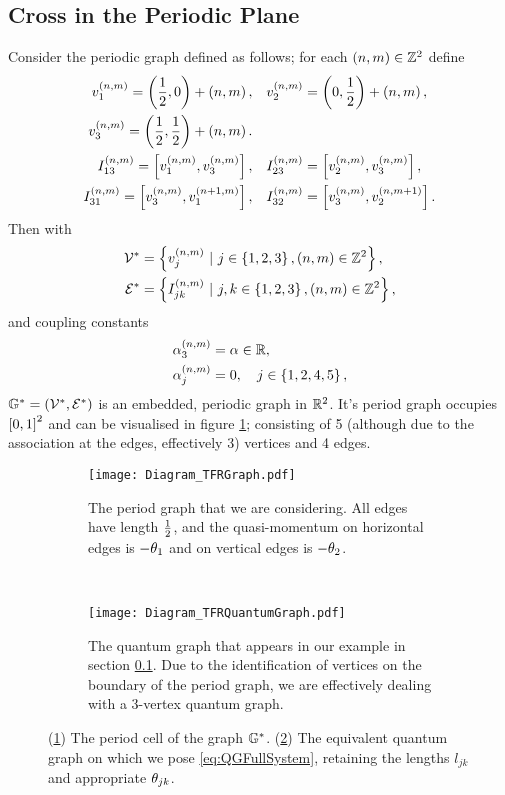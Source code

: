 \subsection{Cross in the Periodic Plane} \label{ssec:ExampleCrossInPlane}
Consider the periodic graph defined as follows; for each $\left( n,m \right)\in\mathbb{Z}^2$ define
\begin{align*}
	v_1^{\left( n,m \right)} = \left( \frac{1}{2},0 \right) + \left( n,m \right), 
	&\quad v_2^{\left( n,m \right)} = \left( 0,\frac{1}{2} \right) + \left( n,m \right), \\
	v_3^{\left( n,m \right)} = \left( \frac{1}{2},\frac{1}{2} \right) + \left( n,m \right). & \\
	I_{13}^{\left( n,m \right)} = \left[ v_1^{\left( n,m \right)}, v_3^{\left( n,m \right)} \right],
	&\quad I_{23}^{\left( n,m \right)} = \left[ v_2^{\left( n,m \right)}, v_3^{\left( n,m \right)} \right], \\
	I_{31}^{\left( n,m \right)} = \left[ v_3^{\left( n,m \right)}, v_1^{\left( n+1,m \right)} \right],
	&\quad I_{32}^{\left( n,m \right)} = \left[ v_3^{\left( n,m \right)}, v_2^{\left( n,m+1 \right)} \right].
\end{align*}
Then with 
\begin{align*}
	\vertSet^* &= \clbracs{v_j^{\bracs{n,m}} \ \vert \ j\in\clbracs{1,2,3}, \bracs{n,m}\in\integers^2}, \\
	\edgeSet^* &= \clbracs{I_{jk}^{\bracs{n,m}} \ \vert \ j,k\in\clbracs{1,2,3}, \bracs{n,m}\in\integers^2},
\end{align*}
and coupling constants
\begin{align*}
	\alpha_3^{\left( n,m \right)} &= \alpha \in\mathbb{R}, \\
	\alpha_j^{\left( n,m \right)} &= 0, \quad j\in\left\{ 1,2,4,5 \right\},
\end{align*}
$\mathbb{G}^* = \left( \mathcal{V}^*,\mathcal{E}^* \right)$ is an embedded, periodic graph in $\mathbb{R}^2$.
It's period graph occupies $\left[ 0,1 \right]^2$ and can be visualised in figure \ref{fig:Diagram_TFRGraph}; consisting of 5 (although due to the association at the edges, effectively 3) vertices and 4 edges.
\begin{figure}[b!]
	\centering
	\begin{subfigure}[t]{0.45\textwidth}
		\centering
		\texttt{[image: Diagram\_TFRGraph.pdf]}
		\caption{\label{fig:Diagram_TFRGraph} The period graph that we are considering. All edges have length $\frac{1}{2}$, and the quasi-momentum on horizontal edges is $-\theta_1$ and on vertical edges is $-\theta_2$.}
	\end{subfigure}
	~
	\begin{subfigure}[t]{0.45\textwidth}
		\centering
		\texttt{[image: Diagram\_TFRQuantumGraph.pdf]}
		\caption{\label{fig:Diagram_TFRQuantumGraph} The quantum graph that appears in our example in section \ref{ssec:ExampleCrossInPlane}. Due to the identification of vertices on the boundary of the period graph, we are effectively dealing with a 3-vertex quantum graph.}
	\end{subfigure}
	\caption{\label{fig:5VertexCross} (\ref{fig:Diagram_TFRGraph}) The period cell of the graph $\mathbb{G}^*$. (\ref{fig:Diagram_TFRQuantumGraph}) The equivalent quantum graph on which we pose \eqref{eq:QGFullSystem}, retaining the lengths $l_{jk}$ and appropriate $\theta_{jk}$.}
\end{figure}
